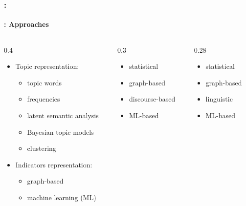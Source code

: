 \documentclass[xcolor=table]{beamer}
\begin{document}
\begin{frame}
	\frametitle{\insertshortsubtitle: \insertsection}
	\framesubtitle{\insertsubsection: Approaches}
	
	\begin{columns}
		\begin{column}{0.4\textwidth}
			\begin{block}{\scriptsize\bfseries\cite{12-nenkova-mckeown}}
				\begin{itemize}
					\item Topic representation:
					\begin{itemize}
						\item topic words
						\item frequencies
						\item latent semantic analysis
						\item Bayesian topic models
						\item clustering
					\end{itemize}
					\item Indicators representation: 
					\begin{itemize}
						\item graph-based
						\item machine learning (ML)
					\end{itemize}
				\end{itemize}
			\end{block}
		\end{column}
		\begin{column}{0.3\textwidth}
			\begin{block}{\scriptsize\bfseries\cite{12-lloret-palomar}}
				\begin{itemize}
					\item statistical 
					\item graph-based
					\item discourse-based
					\item ML-based
				\end{itemize}
			\end{block}
		\end{column}
		\begin{column}{0.28\textwidth}
			\begin{block}{\scriptsize\bfseries\cite{19-aries-al}}
				\begin{itemize}
					\item statistical
					\item graph-based
					\item linguistic 
					\item ML-based
				\end{itemize}
			\end{block}
		\end{column}
	\end{columns}

\end{frame}
\end{document}
